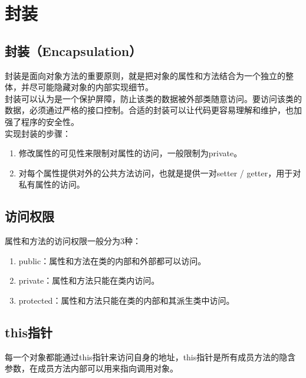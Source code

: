 \newpage

\section{封装}

\subsection{封装（Encapsulation）}

封装是面向对象方法的重要原则，就是把对象的属性和方法结合为一个独立的整体，并尽可能隐藏对象的内部实现细节。\\

封装可以认为是一个保护屏障，防止该类的数据被外部类随意访问。要访问该类的数据，必须通过严格的接口控制。合适的封装可以让代码更容易理解和维护，也加强了程序的安全性。\\

实现封装的步骤：

\begin{enumerate}
	\item 修改属性的可见性来限制对属性的访问，一般限制为private。
	\item 对每个属性提供对外的公共方法访问，也就是提供一对setter / getter，用于对私有属性的访问。
\end{enumerate}

\vspace{0.5cm}

\subsection{访问权限}

属性和方法的访问权限一般分为3种：

\begin{enumerate}
	\item public：属性和方法在类的内部和外部都可以访问。
	\item private：属性和方法只能在类内访问。
	\item protected：属性和方法只能在类的内部和其派生类中访问。
\end{enumerate}

\vspace{0.5cm}

\subsection{this指针}

每一个对象都能通过this指针来访问自身的地址，this指针是所有成员方法的隐含参数，在成员方法内部可以用来指向调用对象。\\

